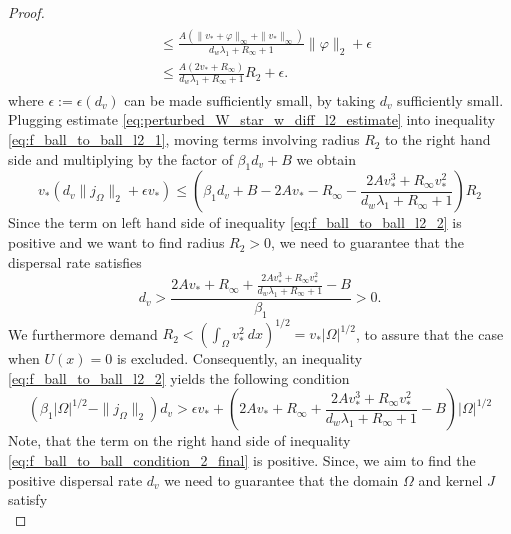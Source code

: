 \documentclass[11pt, a4paper]{article}
\theoremstyle{break}
\theoremstyle{break}
\theoremstyle{break}
\theoremstyle{break}
\theoremstyle{break}
\theoremstyle{break}
\theoremstyle{break}
\begin{document}
\begin{proof}
\begin{align}
\begin{split}
            &\leq \frac{A(\|v_* + \varphi\|_\infty + \|v_*\|_\infty)}{d_w\lambda_1 + R_\infty + 1} \|\varphi\|_2 + \epsilon \\
            &\leq \frac{  A  (2v_* + R_\infty)}{d_w\lambda_1 + R_\infty + 1} R_2 + \epsilon.
        \end{split}
    \end{align}
    where $\epsilon := \epsilon(d_v)$ can be made sufficiently small, by taking $d_v$ sufficiently small. Plugging estimate \eqref{eq:perturbed_W_star_w_diff_l2_estimate} into inequality \eqref{eq:f_ball_to_ball_l2_1}, moving terms involving radius $R_2$ to the right hand side and multiplying by the factor of $\beta_1 d_v + B$ we obtain
    \begin{equation}
        \label{eq:f_ball_to_ball_l2_2}
        v_*(d_v\|j_\Omega\|_2 + \epsilon v_*)
        \leq
        \left(
        \beta_1 d_v + B 
        - 2A v_* 
        - R_\infty 
        - \frac{ 2A v_*^3 + R_\infty v_*^2 }{d_w\lambda_1 + R_\infty + 1}\right)
        R_2
    \end{equation}
    Since the term on left hand side of inequality \eqref{eq:f_ball_to_ball_l2_2} is positive and we want to find radius $R_2 > 0$, we need to guarantee that the dispersal rate satisfies
    \begin{equation}
        \label{eq:d_v_lowerbound_2}
        d_v > \frac{
        2A v_*
        +
        R_\infty 
        +
        \frac{ 2A v_*^3 + R_\infty v_*^2 }{d_w\lambda_1 + R_\infty + 1}
        -
        B}{\beta_1} > 0.
    \end{equation}
    We furthermore demand $R_2 < \left(\int_\Omega v_*^2 \:dx\right)^{1/2} = v_* |\Omega|^{1/2}$, to assure that the case when $U(x) = 0$ is excluded. Consequently, an inequality \eqref{eq:f_ball_to_ball_l2_2} yields the following condition
    \begin{equation}
        \label{eq:f_ball_to_ball_condition_2_final}
        \left( \beta_1 |\Omega|^{1/2} - \|j_\Omega\|_2 \right) d_v 
        >
        \epsilon v_* + \left( 2A v_*
        +
        R_\infty 
        +
        \frac{ 2A v_*^3 + R_\infty v_*^2 }{d_w\lambda_1 + R_\infty + 1}
        -
        B  \right) |\Omega|^{1/2}
    \end{equation} 
    Note, that the term on the right hand side of inequality \eqref{eq:f_ball_to_ball_condition_2_final} is positive. Since, we aim to find the positive dispersal rate $d_v$ we need to guarantee that the domain $\Omega$ and kernel $J$ satisfy
    \begin{equation}

\end{equation}
\end{proof}
\end{document}
